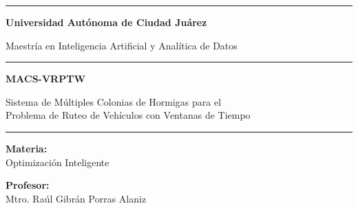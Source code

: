 \documentclass[12pt, letterpaper]{article}
\begin{document}
\begin{titlepage}
  \begin{center}

    \vspace*{0.3cm}


    \vspace{0.5cm}

    {\color{azulUACJ}\rule{\textwidth}{2pt}}

    \vspace{0.5cm}

    {\LARGE\bfseries\color{azulUACJ}
      Universidad Autónoma de Ciudad Juárez}

    \vspace{0.3cm}

    {\large\color{azulUACJ}
      Maestría en Inteligencia Artificial y Analítica de Datos}

    \vspace{0.3cm}

    {\color{oroUACJ}\rule{0.6\textwidth}{1pt}}

    \vspace{0.8cm}

    {\Huge\bfseries\color{azulUACJ}
      MACS-VRPTW}

    \vspace{0.5cm}

    {\Large\color{azulUACJ}
      Sistema de Múltiples Colonias de Hormigas para el\\
      Problema de Ruteo de Vehículos con Ventanas de Tiempo}

    \vspace{0.8cm}

    {\color{oroUACJ}\rule{0.6\textwidth}{1pt}}

    \vspace{0.5cm}

    {\large\bfseries\color{azulUACJ} Materia:}\\[0.15cm]
    {\large Optimización Inteligente}

    \vspace{0.5cm}

    {\large\bfseries\color{azulUACJ} Profesor:}\\[0.15cm]
    {\large Mtro. Raúl Gibrán Porras Alaniz}

    \vspace{0.5cm}


\end{center}
\end{titlepage}
\end{document}
